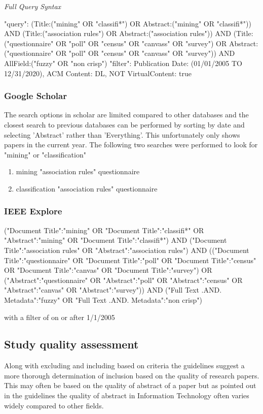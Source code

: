 \noindent
\textit{Full Query Syntax}

\noindent
"query": { (Title:("mining" OR "classifi*") OR Abstract:("mining" OR "classifi*")) AND (Title:("association rules") OR Abstract:("association rules")) AND (Title:("questionnaire" OR "poll" OR "census" OR "canvass" OR "survey") OR Abstract:("questionnaire" OR "poll" OR "census" OR "canvass" OR "survey")) AND AllField:("fuzzy" OR "non crisp") }
"filter": { Publication Date: (01/01/2005 TO 12/31/2020), ACM Content: DL, NOT VirtualContent: true }

\subsubsection{Google Scholar}
\noindent
The search options in scholar are limited compared to other databases and the closest search to previous databases can be performed by sorting by date and selecting 'Abstract' rather than 'Everything'. This unfortunately only shows papers in the current year. The following two searches were performed to look for "mining" or "classification"

\begin{enumerate}
  \item mining "association rules" questionnaire
  \item classification "association rules" questionnaire
\end{enumerate}

\subsubsection{IEEE Explore}
\noindent
("Document Title":"mining"  OR "Document Title":"classifi*" OR "Abstract":"mining" OR "Document Title":"classifi*") AND
("Document Title":"association rules" OR "Abstract":"association rules") AND
(("Document Title":"questionnaire" OR "Document Title":"poll" OR  "Document Title":"census" OR "Document Title":"canvas" OR "Document Title":"survey") OR
("Abstract":"questionnaire" OR "Abstract":"poll" OR  "Abstract":"census" OR "Abstract":"canvas" OR "Abstract":"survey"))  AND
("Full Text .AND. Metadata":"fuzzy" OR "Full Text .AND. Metadata":"non crisp")

\noindent
with a filter of on or after 1/1/2005


\subsection{Study quality assessment}

Along with excluding and including based on criteria the guidelines suggest a more thorough determination of inclusion based on the quality of research papers. This may often be based on the quality of abstract of a paper but as pointed out in the guidelines the quality of abstract in Information Technology often varies widely compared to other fields.







